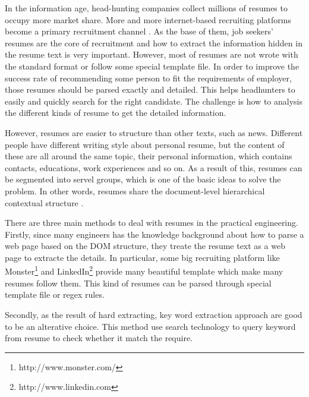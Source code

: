 \documentclass{acm_proc_article-sp}
\begin{document}
In the information age, head-hunting companies collect millions of resumes to occupy more market share.
More and more internet-based recruiting platforms become a primary recruitment channel \cite{al2012survey}.
As the base of them, job seekers' resumes are the core of recruitment and how to extract the information hidden in the resume text is very important.
However, most of resumes are not wrote with the standard format or follow some special template file.
In order to improve the success rate of recommending some person to fit the requirements of employer, those resumes should be parsed exactly and detailed.
This helps headhunters to easily and quickly search for the right candidate.
The challenge is how to analysis the different kinds of resume to get the detailed information.

However, resumes are easier to structure than other texts, such as news. 
Different people have different writing style about personal resume, but the content of these are all around the same topic, their personal information, which contains contacts, educations, work experiences and so on.
As a result of this, resumes can be segmented into servel groups, which is one of the basic ideas to solve the problem.
In other words, resumes share the document-level hierarchical contextual structure \cite{maheshwari2010approach}.

There are three main methods to deal with resumes in the practical engineering. 
Firstly, since many engineers has the knowledge background about how to parse a web page based on the DOM structure, they treate the resume text as a web page to extracte the details. 
In particular, some big recruiting platform like Monster\footnote{http://www.monster.com/} and LinkedIn\footnote{http://www.linkedin.com} provide many beautiful template which make many resumes follow them.
This kind of resumes can be parsed through special template file or regex rules.

Secondly, as the result of hard extracting, key word extraction approach are good to be an alterative choice.
This method use search technology to query keyword from resume to check whether it match the require.
\end{document}

